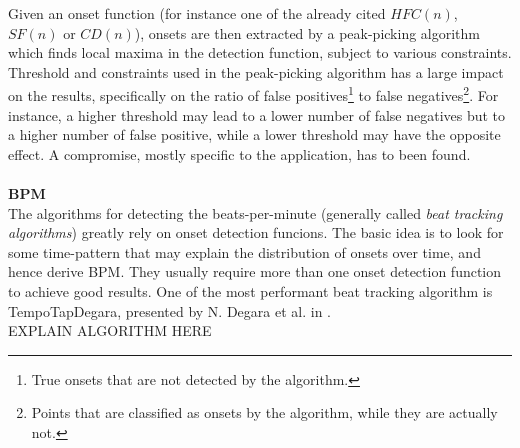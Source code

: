 Given an onset function (for instance one of the already cited $HFC(n)$, $SF(n)$ or $CD(n)$), onsets are then extracted by a peak-picking algorithm which finds local maxima in the detection function, subject to various constraints. Threshold and constraints used in the peak-picking algorithm has a large impact on the results, specifically on the ratio of false positives\footnote{True onsets that are not detected by the algorithm.} to false negatives\footnote{Points that are classified as onsets by the algorithm, while they are actually not.}. For instance, a higher threshold may lead to a lower number of false negatives but to a higher number of false positive, while a lower threshold may have the opposite effect. A compromise, mostly specific to the application, has to been found.
\\ \\ 
\textbf{BPM} \\ 
The algorithms for detecting the beats-per-minute (generally called \textit{beat tracking algorithms}) greatly rely on onset detection funcions. The basic idea is to look for some time-pattern that may explain the distribution of onsets over time, and hence derive BPM. They usually require more than one onset detection function to achieve good results. One of the most performant beat tracking algorithm is TempoTapDegara, presented by N. Degara et al. in \cite{degara12}. \\ EXPLAIN ALGORITHM HERE


